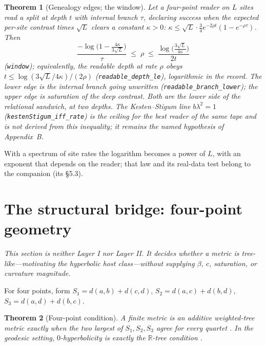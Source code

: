 \documentclass[11pt,reqno]{amsart}
\theoremstyle{plain}
\newtheorem{theorem}{Theorem}[section]
\theoremstyle{definition}
\begin{document}
\begin{theorem}[Genealogy edges; the window]\label{thm:window}
Let a four-point reader on $L$ sites read a split at depth $t$ with internal branch $\tau$, declaring success when the expected per-site contrast times $\sqrt L$ clears a constant $\kappa>0$: $\kappa\le\sqrt L\cdot\tfrac34e^{-2\rho t}(1-e^{-\rho\tau})$. Then
\[
\frac{-\log\bigl(1-\tfrac{4\kappa}{3\sqrt L}\bigr)}{\tau}\;\le\;\rho\;\le\;\frac{\log\bigl(\tfrac{3\sqrt L}{4\kappa}\bigr)}{2t}
\]
(\texttt{window}); equivalently, the readable depth at rate $\rho$ obeys $t\le\log(3\sqrt L/4\kappa)/(2\rho)$ (\texttt{readable\_\allowbreak{}depth\_\allowbreak{}le}), logarithmic in the record. The lower edge is the internal branch going unwritten (\texttt{readable\_\allowbreak{}branch\_\allowbreak{}lower}); the upper edge is saturation of the deep contrast. Both are the lower side of the relational sandwich, at two depths. The Kesten--Stigum line $b\lambda^2=1$ (\texttt{kestenStigum\_\allowbreak{}iff\_\allowbreak{}rate}) is the ceiling for the \emph{best} reader of the same tape and is not derived from this inequality; it remains the named hypothesis of Appendix~B.
\end{theorem}

With a spectrum of site rates the logarithm becomes a power of $L$, with an exponent that depends on the reader; that law and its real-data test belong to the companion (its \S5.3).

\section{The structural bridge: four-point geometry}\label{sec:classifier}

\emph{This section is neither Layer I nor Layer II. It decides whether a metric is tree-like---motivating the hyperbolic host class---without supplying $\beta$, $c$, saturation, or curvature magnitude.}

For four points, form $S_1=d(a,b)+d(c,d)$, $S_2=d(a,c)+d(b,d)$, $S_3=d(a,d)+d(b,c)$.

\begin{theorem}[Four-point condition]\label{thm:fourpoint}
A finite metric is an additive weighted-tree metric exactly when the two largest of $S_1,S_2,S_3$ agree for every quartet \cite{buneman1971}. In the geodesic setting, $0$-hyperbolicity is exactly the $\mathbb R$-tree condition \cite{gromov1987}.
\end{theorem}
\end{document}
